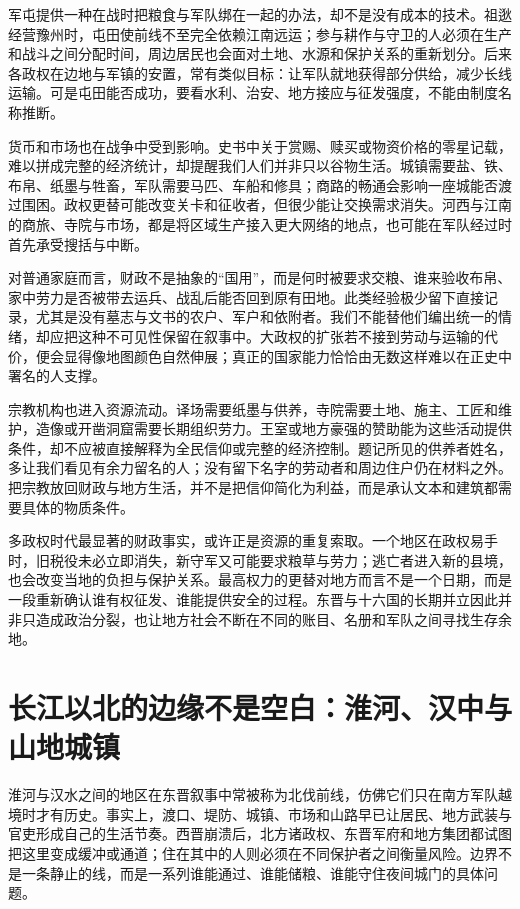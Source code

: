 军屯提供一种在战时把粮食与军队绑在一起的办法，却不是没有成本的技术。祖逖经营豫州时，屯田使前线不至完全依赖江南远运；参与耕作与守卫的人必须在生产和战斗之间分配时间，周边居民也会面对土地、水源和保护关系的重新划分。后来各政权在边地与军镇的安置，常有类似目标：让军队就地获得部分供给，减少长线运输。可是屯田能否成功，要看水利、治安、地方接应与征发强度，不能由制度名称推断。

货币和市场也在战争中受到影响。史书中关于赏赐、赎买或物资价格的零星记载，难以拼成完整的经济统计，却提醒我们人们并非只以谷物生活。城镇需要盐、铁、布帛、纸墨与牲畜，军队需要马匹、车船和修具；商路的畅通会影响一座城能否渡过围困。政权更替可能改变关卡和征收者，但很少能让交换需求消失。河西与江南的商旅、寺院与市场，都是将区域生产接入更大网络的地点，也可能在军队经过时首先承受搜括与中断。

对普通家庭而言，财政不是抽象的“国用”，而是何时被要求交粮、谁来验收布帛、家中劳力是否被带去运兵、战乱后能否回到原有田地。此类经验极少留下直接记录，尤其是没有墓志与文书的农户、军户和依附者。我们不能替他们编出统一的情绪，却应把这种不可见性保留在叙事中。大政权的扩张若不接到劳动与运输的代价，便会显得像地图颜色自然伸展；真正的国家能力恰恰由无数这样难以在正史中署名的人支撑。

宗教机构也进入资源流动。译场需要纸墨与供养，寺院需要土地、施主、工匠和维护，造像或开凿洞窟需要长期组织劳力。王室或地方豪强的赞助能为这些活动提供条件，却不应被直接解释为全民信仰或完整的经济控制。题记所见的供养者姓名，多让我们看见有余力留名的人；没有留下名字的劳动者和周边住户仍在材料之外。把宗教放回财政与地方生活，并不是把信仰简化为利益，而是承认文本和建筑都需要具体的物质条件。

多政权时代最显著的财政事实，或许正是资源的重复索取。一个地区在政权易手时，旧税役未必立即消失，新守军又可能要求粮草与劳力；逃亡者进入新的县境，也会改变当地的负担与保护关系。最高权力的更替对地方而言不是一个日期，而是一段重新确认谁有权征发、谁能提供安全的过程。东晋与十六国的长期并立因此并非只造成政治分裂，也让地方社会不断在不同的账目、名册和军队之间寻找生存余地。

\section{长江以北的边缘不是空白：淮河、汉中与山地城镇}
\label{sec:eastern-jin-depth-frontiers}

淮河与汉水之间的地区在东晋叙事中常被称为北伐前线，仿佛它们只在南方军队越境时才有历史。事实上，渡口、堤防、城镇、市场和山路早已让居民、地方武装与官吏形成自己的生活节奏。西晋崩溃后，北方诸政权、东晋军府和地方集团都试图把这里变成缓冲或通道；住在其中的人则必须在不同保护者之间衡量风险。边界不是一条静止的线，而是一系列谁能通过、谁能储粮、谁能守住夜间城门的具体问题。

